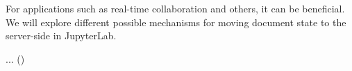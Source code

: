 \begin{task}[
  title=Server-side Document State,
  id=server-state,
  lead=UPSUD,
  PM=20,
  wphases={0-48},
  partners={SRL,QS}
]
  For applications such as real-time collaboration and others,
  it can be beneficial.
  We will explore different possible mechanisms for moving document state
  to the server-side in JupyterLab.

  \begin{compactitem}
  \item ...
    ()
  \end{compactitem}
\end{task}
